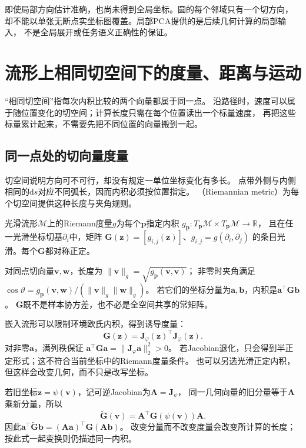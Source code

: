 即使局部方向估计准确，也尚未得到全局坐标。圆的每个邻域只有一个切方向，
却不能以单张无断点实坐标图覆盖。局部PCA提供的是后续几何计算的局部输入，
不是全局展开或任务语义正确性的保证。

\section{流形上相同切空间下的度量、距离与运动}
\label{sec:geometry-metric-path-geodesic}

“相同切空间”指每次内积比较的两个向量都属于同一点。
沿路径时，速度可以属于随位置变化的切空间；计算长度只需在每个位置读出一个标量速度，
再把这些标量累计起来，不需要先把不同位置的向量搬到一起。

\subsection{同一点处的切向量度量}
\label{sec:geometry-same-point-metric}

切空间说明方向可不可行，却没有规定一单位坐标变化有多长。
点带外侧与内侧相同的$\mathrm ds$对应不同弧长，因而内积必须按位置指定。
（Riemannian metric）为每个切空间提供这种长度与夹角规则。

\begin{definition}[Riemann度量]
\label{def:geometry-riemannian-metric}
光滑流形$\mathcal M$上的Riemann度量$g$为每个$\bm p$指定内积
$g_{\bm p}:T_{\bm p}\mathcal M\times T_{\bm p}\mathcal M\to\mathbb R$，
且在任一光滑坐标切基$\partial_i$中，矩阵
$\bm G(\bm z)=[g_{i,j}(\bm z)]$、$g_{i,j}=g(\partial_i,\partial_j)$
的条目光滑。每个$\bm G$都对称正定。
\end{definition}
对同点切向量$\bm v,\bm w$，长度为
$\lVert\bm v\rVert_g=\sqrt{g_{\bm p}(\bm v,\bm v)}$；
非零时夹角满足
$\cos\vartheta=g_{\bm p}(\bm v,\bm w)/
(\lVert\bm v\rVert_g\lVert\bm w\rVert_g)$。
若它们的坐标分量为$\bm a,\bm b$，内积是$\bm a^\top\bm G\bm b$。
$\bm G$既不是样本协方差，也不必是全空间共享的常矩阵。

嵌入流形可以限制环境欧氏内积，得到诱导度量：
\begin{equation}
 \bm G(\bm z)=\bm J_\varphi(\bm z)^\top\bm J_\varphi(\bm z).
 \label{eq:geometry-induced-metric}
\end{equation}
对非零$\bm a$，满列秩保证
$\bm a^\top\bm G\bm a=\lVert\bm J_\varphi\bm a\rVert_2^2>0$。
若Jacobian退化，只会得到半正定形式；这不符合当前坐标中的Riemann度量条件。
也可以另选光滑正定内积，但这样会改变几何，而不只是改写坐标。

若旧坐标$\bm z=\psi(\bm v)$，记可逆Jacobian为$\bm A=\bm J_\psi$，
同一几何向量的旧分量等于$\bm A$乘新分量，所以
\begin{equation}
 \widetilde{\bm G}(\bm v)=
 \bm A^\top\bm G(\psi(\bm v))\bm A.
 \label{eq:geometry-metric-coordinate-transform}
\end{equation}
因此$\bm a^\top\widetilde{\bm G}\bm b
=(\bm A\bm a)^\top\bm G(\bm A\bm b)$。
改变分量而不改变度量会改变所计算的长度；按此式一起变换则仍描述同一内积。

